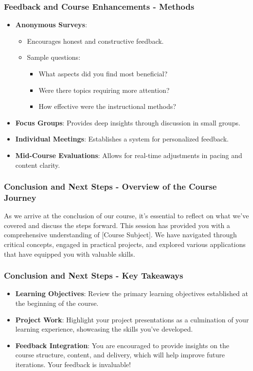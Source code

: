 \documentclass[aspectratio=169]{beamer}
\begin{document}
\begin{frame}[fragile]
    \frametitle{Feedback and Course Enhancements - Methods}
    \begin{itemize}
        \item \textbf{Anonymous Surveys}: 
            \begin{itemize}
                \item Encourages honest and constructive feedback.
                \item Sample questions:
                    \begin{itemize}
                        \item What aspects did you find most beneficial?
                        \item Were there topics requiring more attention?
                        \item How effective were the instructional methods?
                    \end{itemize}
            \end{itemize}
        \item \textbf{Focus Groups}: Provides deep insights through discussion in small groups.
        
        \item \textbf{Individual Meetings}: Establishes a system for personalized feedback.
        
        \item \textbf{Mid-Course Evaluations}: Allows for real-time adjustments in pacing and content clarity.
    \end{itemize}
\end{frame}

\begin{frame}[fragile]
    \frametitle{Conclusion and Next Steps - Overview of the Course Journey}
    As we arrive at the conclusion of our course, it’s essential to reflect on what we've covered and discuss the steps forward. This session has provided you with a comprehensive understanding of [Course Subject]. We have navigated through critical concepts, engaged in practical projects, and explored various applications that have equipped you with valuable skills.
\end{frame}

\begin{frame}[fragile]
    \frametitle{Conclusion and Next Steps - Key Takeaways}
    \begin{itemize}
        \item \textbf{Learning Objectives}: Review the primary learning objectives established at the beginning of the course.
        \item \textbf{Project Work}: Highlight your project presentations as a culmination of your learning experience, showcasing the skills you've developed.
        \item \textbf{Feedback Integration}: You are encouraged to provide insights on the course structure, content, and delivery, which will help improve future iterations. Your feedback is invaluable!
    \end{itemize}
\end{frame}
\end{document}
